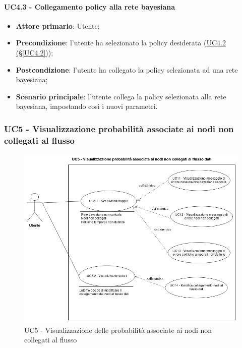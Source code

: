 \paragraph{UC4.3 - Collegamento policy alla rete bayesiana}\label{UC4.3}
\begin{itemize}
	\item \textbf{Attore primario}: Utente; 
	\item \textbf{Precondizione}: l'utente ha selezionato la policy desiderata (\hyperref[UC4.2]{UC4.2 (§\ref*{UC4.2})});
	\item \textbf{Postcondizione}: l'utente ha collegato la policy selezionata ad una rete bayesiana; 
	\item \textbf{Scenario principale}: l'utente collega la policy selezionata alla rete bayesiana, impostando cosi i nuovi parametri. 
\end{itemize}

\newpage

\subsubsection{UC5 - Visualizzazione probabilità associate ai nodi non collegati al flusso}\label{UC5}

\begin{figure}[H]
\centering
\includegraphics[scale=0.4]{./images/UC5.png}
\caption{UC5 - Visualizzazione delle probabilità associate ai nodi non collegati al flusso}
\end{figure}

